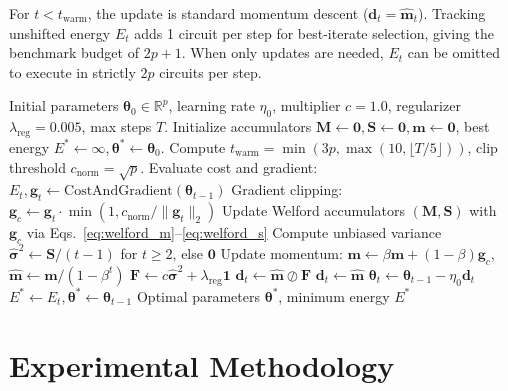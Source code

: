 \documentclass[sn-mathphys,Numbered]{sn-jnl}
\theoremstyle{thmstyleone}
\theoremstyle{thmstyletwo}
\theoremstyle{thmstylethree}
\begin{document}
For $t < t_{\text{warm}}$, the update is standard momentum descent ($\mathbf{d}_t = \hat{\mathbf{m}}_t$). Tracking unshifted energy $E_t$ adds 1 circuit per step for best-iterate selection, giving the benchmark budget of $2p+1$. When only updates are needed, $E_t$ can be omitted to execute in strictly $2p$ circuits per step.

\begin{algorithm}[H]
\caption{SIGMA-QGD Optimization Algorithm}
\label{alg:sigma_qgd}
\begin{algorithmic}[1]
\REQUIRE Initial parameters $\boldsymbol{\theta}_0 \in \mathbb{R}^p$, learning rate $\eta_0$, multiplier $c=1.0$, regularizer $\lambda_{\text{reg}}=0.005$, max steps $T$.
\STATE Initialize accumulators $\mathbf{M} \leftarrow \mathbf{0}, \mathbf{S} \leftarrow \mathbf{0}, \mathbf{m} \leftarrow \mathbf{0}$, best energy $E^* \leftarrow \infty, \boldsymbol{\theta}^* \leftarrow \boldsymbol{\theta}_0$.
\STATE Compute $t_{\text{warm}} = \min(3p, \max(10, \lfloor T/5 \rfloor))$, clip threshold $c_{\text{norm}} = \sqrt{p}$.
    \STATE Evaluate cost and gradient: $E_t, \mathbf{g}_t \leftarrow \text{CostAndGradient}(\boldsymbol{\theta}_{t-1})$ \hfill {}
    \STATE Gradient clipping: $\mathbf{g}_c \leftarrow \mathbf{g}_t \cdot \min(1, c_{\text{norm}} / \|\mathbf{g}_t\|_2)$
    \STATE Update Welford accumulators $(\mathbf{M}, \mathbf{S})$ with $\mathbf{g}_c$ via Eqs.~\eqref{eq:welford_m}--\eqref{eq:welford_s}
    \STATE Compute unbiased variance $\hat{\boldsymbol{\sigma}}^2 \leftarrow \mathbf{S} / (t-1)$ for $t \ge 2$, else $\mathbf{0}$
    \STATE Update momentum: $\mathbf{m} \leftarrow \beta \mathbf{m} + (1-\beta)\mathbf{g}_c$, $\hat{\mathbf{m}} \leftarrow \mathbf{m} / (1-\beta^t)$
        \STATE $\mathbf{F} \leftarrow c \hat{\boldsymbol{\sigma}}^2 + \lambda_{\text{reg}} \mathbf{1}$
        \STATE $\mathbf{d}_t \leftarrow \hat{\mathbf{m}} \oslash \mathbf{F}$
    \ELSE
        \STATE $\mathbf{d}_t \leftarrow \hat{\mathbf{m}}$
    \ENDIF
    \STATE $\boldsymbol{\theta}_t \leftarrow \boldsymbol{\theta}_{t-1} - \eta_0 \mathbf{d}_t$
        \STATE $E^* \leftarrow E_t, \boldsymbol{\theta}^* \leftarrow \boldsymbol{\theta}_{t-1}$
    \ENDIF
\ENDFOR
\RETURN Optimal parameters $\boldsymbol{\theta}^*$, minimum energy $E^*$
\end{algorithmic}
\end{algorithm}

\FloatBarrier

\section{Experimental Methodology}
\label{sec:setup}
\end{document}
